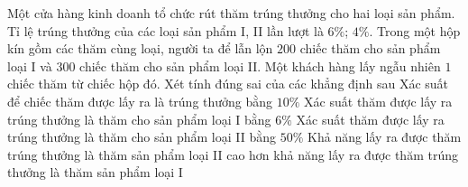 \begin{ex}%
	Một cửa hàng kinh doanh tổ chức rút thăm trúng thưởng cho hai loại sản phẩm. Tỉ lệ trúng thưởng của các loại sản phẩm I, II lần lượt là $6 \%$; $4 \%$. Trong một hộp kín gồm các thăm cùng loại, người ta để lẫn lộn $200$ chiếc thăm cho sản phẩm loại I và $300$ chiếc thăm cho sản phẩm loại II. Một khách hàng lấy ngẫu nhiên $1$ chiếc thăm từ chiếc hộp đó. Xét tính đúng sai của các khẳng định sau
	\choiceTF
	{Xác suất để chiếc thăm được lấy ra là trúng thưởng bằng $10\%$}
	{Xác suất thăm được lấy ra trúng thưởng là thăm cho sản phẩm loại I bằng $6\%$ }
	{\True Xác suất thăm được lấy ra trúng thưởng là thăm cho sản phẩm loại II bằng $50\%$}
	{Khả năng lấy ra được thăm trúng thưởng là thăm sản phẩm loại II cao hơn khả năng lấy ra được thăm trúng thưởng là thăm sản phẩm loại I}
\end{ex}
